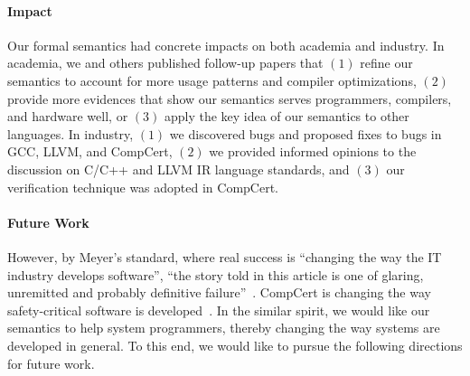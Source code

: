\paragraph{Impact}

Our formal semantics had concrete impacts on both academia and industry.  In academia, we and others
published follow-up papers that $(1)$ refine our semantics to account for more usage patterns and
compiler optimizations, $(2)$ provide more evidences that show our semantics serves programmers,
compilers, and hardware well, or $(3)$ apply the key idea of our semantics to other languages.  In
industry, $(1)$ we discovered bugs and proposed fixes to bugs in GCC, LLVM, and CompCert, $(2)$ we
provided informed opinions to the discussion on C/C++ and LLVM IR language standards, and $(3)$ our
verification technique was adopted in CompCert.



\paragraph{Future Work}

However, by Meyer's standard, where real success is ``changing the way the IT industry develops
software'', ``the story told in this article is one of glaring, unremitted and probably definitive
failure''~\cite{bertrand-meyer}.  CompCert is changing the way safety-critical software is
developed~\cite{compcert-avionics,compcert-nuclear}.  In the similar spirit, we would like our
semantics to help system programmers, thereby changing the way systems are developed in general.  To
this end, we would like to pursue the following directions for future work.

